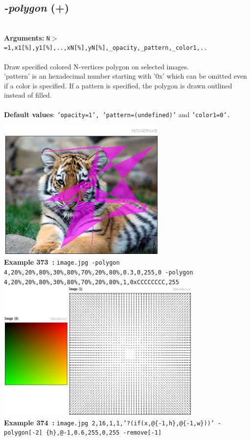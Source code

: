 \documentclass[a4paper,11pt,twoside]{book}
\begin{document}
\subsection{\emph{-polygon} (+)}\vspace*{-0.5em}
~\\\textbf{Arguments: } 
{\small \texttt{N$>$=1,x1[\%],y1[\%],..,xN[\%],yN[\%],\_opacity,\_pattern,\_color1,..}}\\~\\
Draw specified colored N-vertices polygon on selected images.
~\\'pattern' is an hexadecimal number starting with '0x' which can be omitted
even if a color is specified. If a pattern is specified, the polygon is
drawn outlined instead of filled.
~\\~\\\textbf{Default values}: {\small \texttt{'opacity=1', 'pattern=(undefined)'} and \texttt{'color1=0'.}}
\begin{center}\includegraphics[keepaspectratio=true,height=7cm,width=\textwidth]{img/gmic_def373.jpg}\\
{\footnotesize \textbf{Example 373~:} \texttt{image.jpg -polygon 4,20\%,20\%,80\%,30\%,80\%,70\%,20\%,80\%,0.3,0,255,0 -polygon 4,20\%,20\%,80\%,30\%,80\%,70\%,20\%,80\%,1,0xCCCCCCCC,255}}
\\\includegraphics[keepaspectratio=true,height=7cm,width=\textwidth]{img/gmic_def374.jpg}\\
{\footnotesize \textbf{Example 374~:} \texttt{image.jpg 2,16,1,1,'?(if(x,@\{-1,h\},@\{-1,w\}))' -polygon[-2] \{h\},@-1,0.6,255,0,255 -remove[-1]}}
\end{center}
\end{document}
